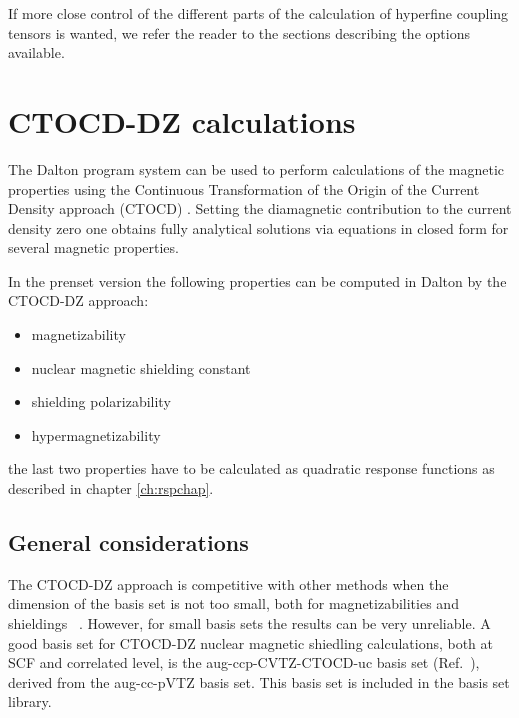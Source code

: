     If more close control of the different parts of the calculation
of hyperfine coupling tensors is wanted, we refer the reader to the
sections describing the options available.



\section{CTOCD-DZ calculations}\label{sec:ctocd}

The Dalton program system can be used to perform calculations of the magnetic 
properties using the Continuous Transformation of the Origin of the Current Density
approach (CTOCD) . Setting the diamagnetic contribution 
to the current density zero one obtains fully analytical solutions via equations 
in closed form for several magnetic properties. 


In the prenset version the following properties can be computed in Dalton by the CTOCD-DZ approach:

\begin{center}
\begin{itemize}{}{}
\item magnetizability
\item nuclear magnetic shielding constant
\item shielding polarizability
\item hypermagnetizability
\end{itemize}
\end{center}
the last two properties have to be calculated as quadratic response functions as described 
in chapter \ref{ch:rspchap}.

\subsection{General considerations}\label{sec:ctocdgeneral}

The CTOCD-DZ approach is competitive with other methods when the dimension
of the basis set is not too small, both for magnetizabilities and
shieldings ~\cite{ctocd}. However, for small basis sets the results can be 
very unreliable. A good basis set for CTOCD-DZ nuclear magnetic shiedling 
calculations, both at SCF and correlated level, is the aug-ccp-CVTZ-CTOCD-uc basis set
(Ref.~\cite{ctocd}), derived from the aug-cc-pVTZ basis set. 
This basis set is included in the basis set library.

